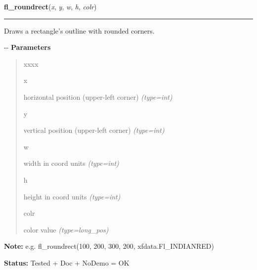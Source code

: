     \label{xformslib:flxbasic:fl_roundrect}

    \vspace{0.5ex}

\hspace{.8\funcindent}\begin{boxedminipage}{\funcwidth}

    \raggedright \textbf{fl\_roundrect}(\textit{x}, \textit{y}, \textit{w}, \textit{h}, \textit{colr})

    \vspace{-1.5ex}

    \rule{\textwidth}{0.5\fboxrule}
\setlength{\parskip}{2ex}

Draws a rectangle's outline with rounded corners.

-{}-
\setlength{\parskip}{1ex}
      \textbf{Parameters}
      \vspace{-1ex}

      \begin{quote}
        \begin{Ventry}{xxxx}

          \item[x]


horizontal position (upper-left corner)
            {\it (type=int)}

          \item[y]


vertical position (upper-left corner)
            {\it (type=int)}

          \item[w]


width in coord units
            {\it (type=int)}

          \item[h]


height in coord units
            {\it (type=int)}

          \item[colr]


color value
            {\it (type=long\_pos)}

        \end{Ventry}

      \end{quote}

\textbf{Note:} 
e.g. fl\_roundrect(100, 200, 300, 200, xfdata.Fl\_INDIANRED)


\textbf{Status:} 
Tested + Doc + NoDemo = OK


    \end{boxedminipage}

